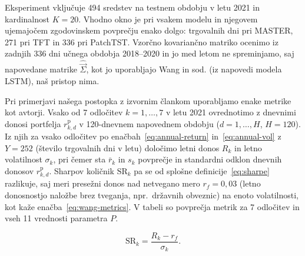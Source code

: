 \documentclass[9pt]{style/friteza}
\begin{document}
Eksperiment vključuje 494 sredstev na testnem obdobju v letu 2021 in kardinalnost $K=20$. Vhodno okno je pri vsakem modelu in njegovem ujemajočem zgodovinskem povprečju enako dolgo: \WangWindowMASTER{} trgovalnih dni pri MASTER, 271 pri TFT in 336 pri PatchTST. Vzorčno kovariančno matriko ocenimo iz zadnjih 336 dni učnega obdobja 2018--2020 in jo med letom ne spreminjamo, saj napovedane matrike $\hat{\vec{\Sigma}}$, kot jo uporabljajo Wang in sod. (iz napovedi modela LSTM), naš pristop nima.

Pri primerjavi našega postopka z izvornim člankom uporabljamo enake metrike kot avtorji. Vsako od 7 odločitev $k=1,\dots,7$ v letu 2021 ovrednotimo z dnevnimi donosi portfelja $r^{\mathrm p}_{k,d}$ v 120-dnevnem napovednem obdobju ($d=1,\dots,H$, $H=120$). Iz njih za vsako odločitev po enačbah~\eqref{eq:annual-return} in~\eqref{eq:annual-vol} z $Y=252$ (število trgovalnih dni v letu) določimo letni donos $R_k$ in letno volatilnost $\sigma_k$, pri čemer sta $\bar r_k$ in $s_k$ povprečje in standardni odklon dnevnih donosov $r^{\mathrm p}_{k,d}$. Sharpov količnik $\mathrm{SR}_k$ pa se od splošne definicije~\eqref{eq:sharpe} razlikuje, saj meri presežni donos nad netvegano mero $r_f=0{,}03$ (letno donosnostjo naložbe brez tveganja, npr.\ državnih obveznic) na enoto volatilnosti, kot kaže enačba~\eqref{eq:wang-metrics}. V tabeli so povprečja metrik za 7 odločitev in vseh 11 vrednosti parametra $P$.

\begin{equation}
\label{eq:wang-metrics}
\mathrm{SR}_k=\frac{R_k-r_f}{\sigma_k}.
\end{equation}
\end{document}
